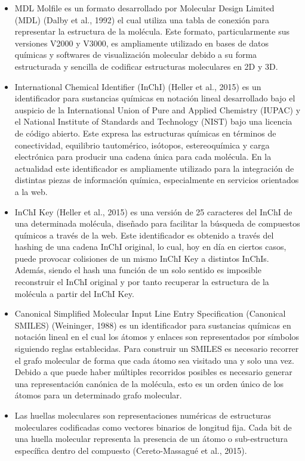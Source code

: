 \begin{itemize}
  \item  MDL Molfile es un formato desarrollado por Molecular Design Limited (MDL) (Dalby et al., 1992) el cual utiliza una tabla de conexión para representar la estructura de la molécula. Este formato, particularmente sus versiones V2000 y V3000, es ampliamente utilizado en bases de datos químicas y softwares de visualización molecular debido a su forma estructurada y sencilla de codificar estructuras moleculares en 2D y 3D.
  \item International Chemical Identifier (InChI) (Heller et al., 2015) es un identificador para sustancias químicas en notación lineal desarrollado bajo el auspicio de la International Union of Pure and Applied Chemistry (IUPAC) y el National Institute of Standards and Technology (NIST) bajo una licencia de código abierto. Este expresa las estructuras químicas en términos de conectividad, equilibrio tautomérico, isótopos, estereoquímica y carga electrónica para producir una cadena única para cada molécula. En la actualidad este identificador es ampliamente utilizado para la integración de distintas piezas de información química, especialmente en servicios orientados a la web.
  \item InChI Key (Heller et al., 2015) es una versión de 25 caracteres del InChI de una determinada molécula, diseñado para facilitar la búsqueda de compuestos químicos a través de la web. Este identificador es obtenido a través del hashing de una cadena InChI original, lo cual, hoy en día en ciertos casos, puede provocar colisiones de un mismo InChI Key a distintos InChIs. Además, siendo el hash una función de un solo sentido es imposible reconstruir el InChI original y por tanto recuperar la estructura de la molécula a partir del InChI Key.
  \item Canonical Simplified Molecular Input Line Entry Specification (Canonical SMILES) (Weininger, 1988) es un identificador para sustancias químicas en notación lineal en el cual los átomos y enlaces son representados por símbolos siguiendo reglas establecidas. Para construir un SMILES es necesario recorrer el grafo molecular de forma que cada átomo sea visitado una y solo una vez. Debido a que puede haber múltiples recorridos posibles es necesario generar una representación canónica de la molécula, esto es un orden único de los átomos para un determinado grafo molecular.
  \item Las huellas moleculares son representaciones numéricas de estructuras moleculares codificadas como vectores binarios de longitud fija. Cada bit de una huella molecular representa la presencia de un átomo o sub-estructura específica dentro del compuesto (Cereto-Massagué et al., 2015). 

\end{itemize}
